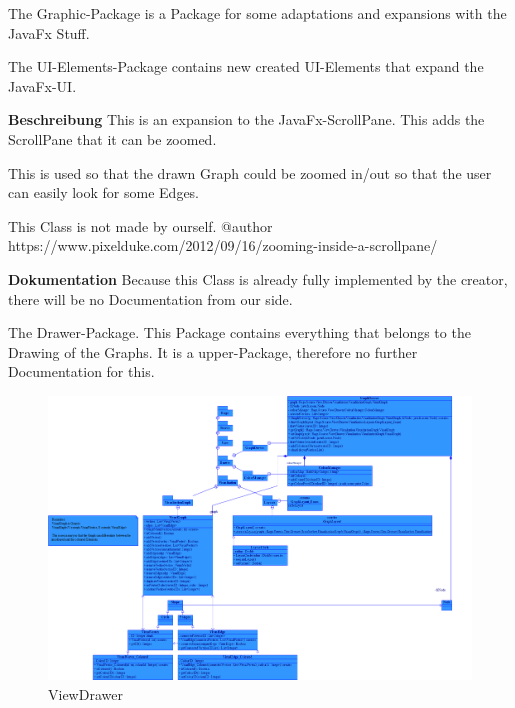 		The Graphic-Package is a Package for some adaptations and expansions with the JavaFx Stuff.
		
		The UI-Elements-Package contains new created UI-Elements that expand the JavaFx-UI.
		
		
			\textbf{Beschreibung}\newline
			This is an expansion to the JavaFx-ScrollPane.
			This adds the ScrollPane that it can be zoomed.
			
			This is used so that the drawn Graph could be zoomed in/out so that the user can easily look for some Edges.
			
			This Class is not made by ourself.
			@author
			https://www.pixelduke.com/2012/09/16/zooming-inside-a-scrollpane/
			
			\textbf{Dokumentation}\newline
			Because this Class is already fully implemented by the creator, there will be no Documentation from our side.

	The Drawer-Package.
	This Package contains everything that belongs to the Drawing of the Graphs.
	It is a upper-Package, therefore no further Documentation for this.
	
		\begin{figure}
	\centering
\includegraphics[width=\textwidth]{abbildungen/ClassDiagram_View_Drawer.png}
\caption{ViewDrawer }
	\label{img:viewdrawer}
	\end{figure}
	
	
